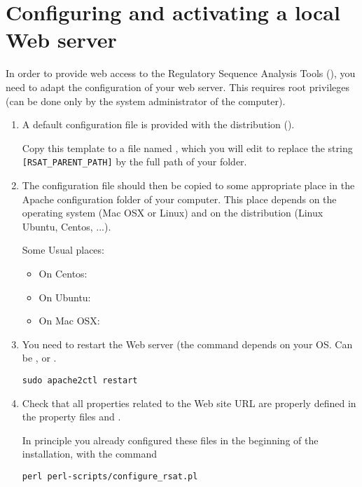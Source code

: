 \section{Configuring and activating a local \RSAT Web server}

In order to provide web access to the Regulatory Sequence Analysis
Tools (\RSAT), you need to adapt the configuration of your web
server. This requires root privileges (can be done only by the system
administrator of the computer).


\begin{enumerate}
\item A default configuration file is provided with the \RSAT
  distribution (). 

  Copy this template to a file named , which you will
  edit to replace the string \texttt{[RSAT\_PARENT\_PATH]} by the
  full path of your  folder.
  
\item The configuration file should then be copied to some appropriate
  place in the Apache configuration folder of your computer. This
  place depends on the operating system (Mac OSX or Linux) and on the
  distribution (Linux Ubuntu, Centos, ...).
  
  Some Usual places:
  \begin{itemize}
  \item On Centos: 
  \item On Ubuntu: 
  \item On Mac OSX: 
  \end{itemize}
  
\item You need to restart the Web server (the command depends on your
  OS. Can be ,  or
  .

  \begin{lstlisting}
sudo apache2ctl restart
  \end{lstlisting}

\item Check that all properties related to the Web site URL are
  properly defined in the \RSAT property files
   and
  . 

  In principle you already configured these files in the beginning of
  the installation, with the command
  \begin{lstlisting}
perl perl-scripts/configure_rsat.pl
  \end{lstlisting}


\end{enumerate}
